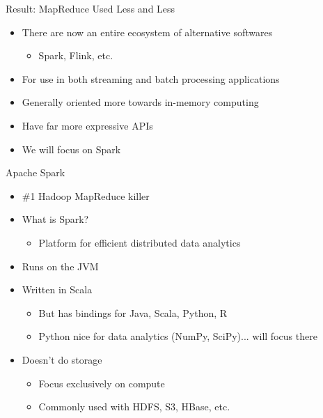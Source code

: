 \documentclass[aspectratio=169]{beamer}
\begin{document}
\begin{frame}{Result: MapReduce Used Less and Less}

\begin{itemize}
\item There are now an entire ecosystem of alternative softwares
	\begin{itemize}
	\item Spark, Flink, etc. 
	\end{itemize}
\item For use in both streaming and batch processing applications
\item Generally oriented more towards in-memory computing
\item Have far more expressive APIs
\item We will focus on Spark
\end{itemize}
\end{frame}

\begin{frame}{Apache Spark}

\begin{itemize}
\item \#1 Hadoop MapReduce killer
\item What is Spark?
	\begin{itemize}
	\item Platform for efficient distributed data analytics
	\end{itemize}
\item Runs on the JVM
\item Written in Scala
	\begin{itemize}
	\item But has bindings for Java, Scala, Python, R
	\item Python nice for data analytics (NumPy, SciPy)... will focus there
	\end{itemize}
\item Doesn't do storage
	\begin{itemize}
	\item Focus exclusively on compute
	\item Commonly used with HDFS, S3, HBase, etc.
	\end{itemize}
\end{itemize}
\end{frame}


\end{document}
